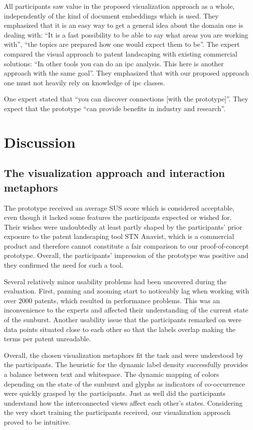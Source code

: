 All participants saw value in the proposed visualization approach as a whole, independently of the kind of document embeddings which is used.
They emphasized that it is an easy way to get a general idea about the domain one is dealing with: ``It is a fast possibility to be able to say what areas you are working with'', ``the topics are prepared how one would expect them to be''.
The expert compared the visual approach to patent landscaping with existing commercial solutions: ``In other tools you can do an \gls{ipc} analysis. This here is another approach with the same goal''.
They emphasized that with our proposed approach one must not heavily rely on knowledge of \gls{ipc} classes.

One expert stated that ``you can discover connections [with the prototype]''.
They expect that the prototype ``can provide benefits in industry and research''.

\section{Discussion}
\label{sec:discussion}

\subsection{The visualization approach and interaction metaphors}

The prototype received an average SUS score which is considered acceptable, even though it lacked some features the participants expected or wished for.
Their wishes were undoubtedly at least partly shaped by the participants' prior exposure to the patent landscaping tool STN Anavist, which is a commercial product and therefore cannot constitute a fair comparison to our proof-of-concept prototype.
Overall, the participants' impression of the prototype was positive and they confirmed the need for such a tool.

Several relatively minor usability problems had been uncovered during the evaluation.
First, panning and zooming start to noticeably lag when working with over 2000 patents, which resulted in performance problems. 
This was an inconvenience to the experts and affected their understanding of the current state of the sunburst.
Another usability issue that the participants remarked on were data points situated close to each other so that the labels overlap making the terms per patent unreadable.

Overall, the chosen visualization metaphors fit the task and were understood by the participants.
The heuristic for the dynamic label density successfully provides a balance between text and whitespace.
The dynamic mapping of colors depending on the state of the sunburst and glyphs as indicators of co-occurrence were quickly grasped by the participants.
Just as well did the participants understand how the interconnected views affect each other's states.
Considering the very short training the participants received, our visualization approach proved to be intuitive.

